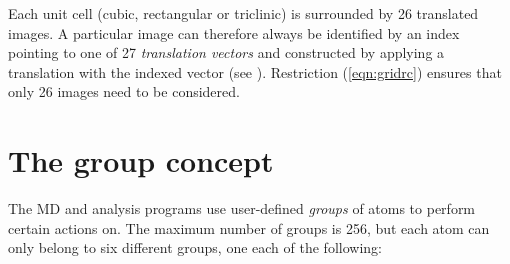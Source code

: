 Each unit cell (cubic, rectangular or triclinic)
is surrounded by 26 translated images. A
particular image can therefore always be identified by an index pointing to one
of 27 {\em translation vectors} and constructed by applying a
translation with the indexed vector (see ).
Restriction (\ref{eqn:gridrc}) ensures that only 26 images need to be
considered.

\section{The group concept}
\label{sec:groupconcept}
The {\gromacs} MD and analysis programs use user-defined {\em groups} of
atoms to perform certain actions on. The maximum number of groups is
256, but each atom can only belong to six different groups, one 
each of the following:
